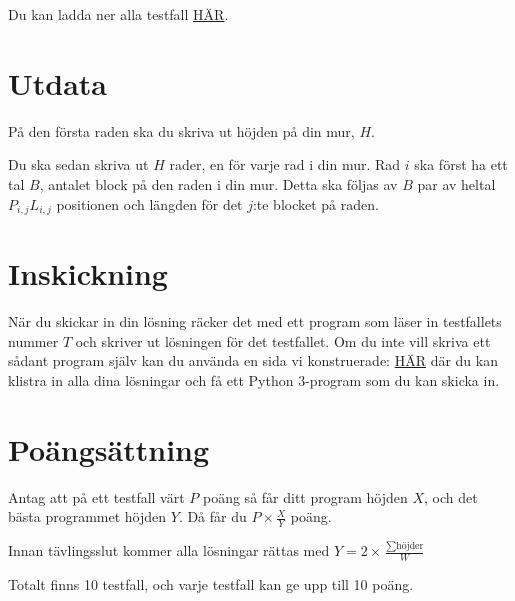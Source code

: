 Du kan ladda ner alla testfall \url{HÄR}.

\section*{Utdata}
På den första raden ska du skriva ut höjden på din mur, $H$.

Du ska sedan skriva ut $H$ rader, en för varje rad i din mur.
Rad $i$ ska först ha ett tal $B$, antalet block på den raden i din mur.
Detta ska följas av $B$ par av heltal $P_{i,j} L_{i,j}$ positionen och längden för det $j$:te blocket på raden.

\section*{Inskickning}
När du skickar in din lösning räcker det med ett program som läser in testfallets nummer $T$ och skriver ut lösningen för det testfallet.
Om du inte vill skriva ett sådant program själv kan du använda en sida vi konstruerade: \url{HÄR} där du kan klistra in
alla dina lösningar och få ett Python 3-program som du kan skicka in.

\section*{Poängsättning}
Antag att på ett testfall värt $P$ poäng så får ditt program höjden $X$, och det bästa programmet höjden $Y$. Då får du $P \times \frac{X}{Y}$ poäng.

Innan tävlingsslut kommer alla lösningar rättas med $Y = 2 \times \frac{\sum{\text{höjder}}}{W}$

Totalt finns 10 testfall, och varje testfall kan ge upp till 10 poäng.
